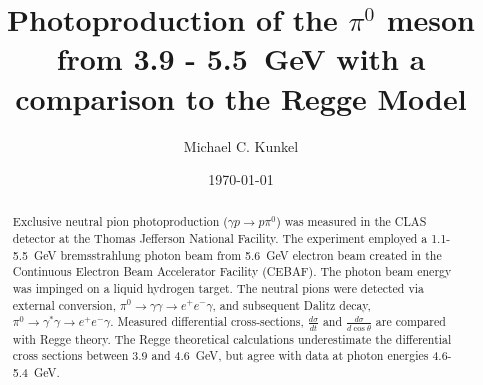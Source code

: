 \documentclass[%
 reprint,
showpacs,
 amsmath,amssymb,
 aps,
]{revtex4-1}
\begin{document}


\title{Photoproduction of the $\pi^0$ meson from 3.9 - 5.5~GeV with a comparison to the Regge Model}%

\author{Michael C. Kunkel}
%


\date{\today}%

\begin{abstract}
Exclusive neutral pion photoproduction ($\gamma p \rightarrow p \pi^0$) was measured in the CLAS detector at the Thomas Jefferson National Facility. The experiment employed a 1.1-5.5~GeV bremsstrahlung photon beam from 5.6~GeV electron beam created in the Continuous Electron Beam Accelerator Facility (CEBAF). The photon beam energy was impinged on a liquid hydrogen target. The neutral pions were detected via external conversion, $\pi^0 \rightarrow \gamma \gamma \rightarrow e^+e^-\gamma$, and subsequent Dalitz decay, $\pi^0 \rightarrow \gamma^* \gamma \rightarrow e^+e^-\gamma$. Measured differential cross-sections, $\frac{d\sigma}{dt}$ and $\frac{d\sigma}{d\cos \theta}$ are compared with Regge theory. The Regge theoretical calculations underestimate the differential cross sections between 3.9 and 4.6~GeV, but agree with data at photon energies 4.6-5.4~GeV.   
\end{abstract}

\maketitle





%
%
%
%



\nocite{*}
%
%
%
\end{document}
